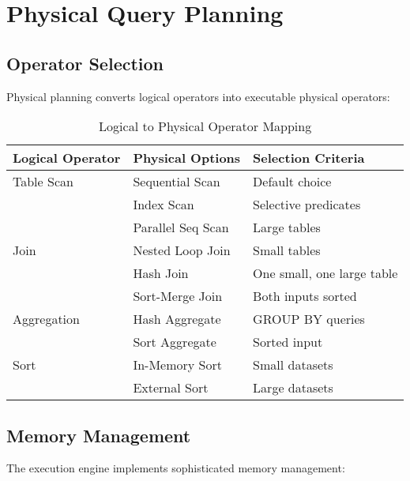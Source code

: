\documentclass[12pt,a4paper]{article}
\begin{document}
    \section{Physical Query Planning}

    \subsection{Operator Selection}

    Physical planning converts logical operators into executable physical operators:

    \begin{table}[H]
        \centering
        \caption{Logical to Physical Operator Mapping}
        \label{tab:operators}
        \begin{tabular}{lll}
            \toprule
            \textbf{Logical Operator} & \textbf{Physical Options} & \textbf{Selection Criteria} \\
            \midrule
            Table Scan & Sequential Scan & Default choice \\
            & Index Scan & Selective predicates \\
            & Parallel Seq Scan & Large tables \\
            \midrule
            Join & Nested Loop Join & Small tables \\
            & Hash Join & One small, one large table \\
            & Sort-Merge Join & Both inputs sorted \\
            \midrule
            Aggregation & Hash Aggregate & GROUP BY queries \\
            & Sort Aggregate & Sorted input \\
            \midrule
            Sort & In-Memory Sort & Small datasets \\
            & External Sort & Large datasets \\
            \bottomrule
        \end{tabular}
    \end{table}

    \subsection{Memory Management}

    The execution engine implements sophisticated memory management:
\end{document}
